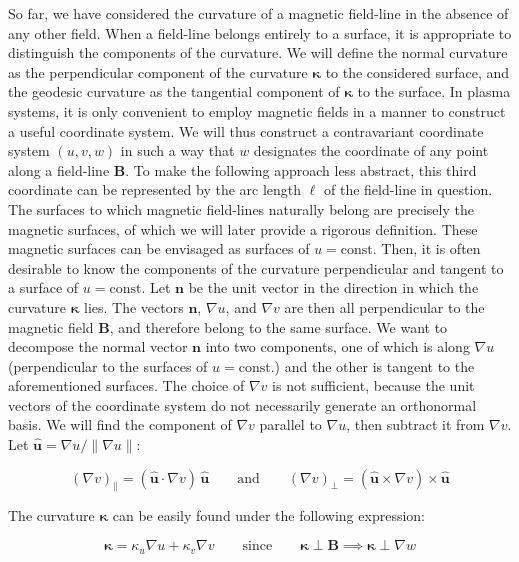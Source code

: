 So far, we have considered the curvature of a magnetic field-line in the absence of any other field. When a field-line belongs entirely to a surface, it is appropriate to distinguish the components of the curvature. We will define the normal curvature as the perpendicular component of the curvature $\boldsymbol{\kappa}$ to the considered surface, and the geodesic curvature as the tangential component of $\boldsymbol{\kappa}$ to the surface. In plasma systems, it is only convenient to employ magnetic fields in a manner to construct a useful coordinate system. We will thus construct a contravariant coordinate system $(u, v, w)$ in such a way that $w$ designates the coordinate of any point along a field-line $\mathbf{B}$. To make the following approach less abstract, this third coordinate can be represented by the arc length $\ell$ of the field-line in question. The surfaces to which magnetic field-lines naturally belong are precisely the magnetic surfaces, of which we will later provide a rigorous definition. These magnetic surfaces can be envisaged as surfaces of $u=\text{const.}$ Then, it is often desirable to know the components of the curvature perpendicular and tangent to a surface of $u=\text{const.}$ Let $\mathbf{n}$ be the unit vector in the direction in which the curvature $\boldsymbol{\kappa}$ lies. The vectors $\mathbf{n}$, $\nabla u$, and $\nabla v$ are then all perpendicular to the magnetic field $\mathbf{B}$, and therefore belong to the same surface. We want to decompose the normal vector $\mathbf{n}$ into two components, one of which is along $\nabla u$ (perpendicular to the surfaces of $u=\text{const.}$) and the other is tangent to the aforementioned surfaces. The choice of $\nabla v$ is not sufficient, because the unit vectors of the coordinate system do not necessarily generate an orthonormal basis. We will find the component of $\nabla v$ parallel to $\nabla u$, then subtract it from $\nabla v$. Let $\mathbf{\hat{u}}=\nabla u/\|\nabla u\|$:

\begin{equation}
    \label{eq-6-7}
    (\nabla v)_\parallel=(\mathbf{\hat{u}}\cdot\nabla v)\,\mathbf{\hat{u}}\quad\quad\text{and}\quad\quad(\nabla v)_\perp=(\mathbf{\hat{u}}\times\nabla v)\times\mathbf{\hat{u}}
\end{equation}

The curvature $\boldsymbol{\kappa}$ can be easily found under the following expression:

\begin{equation}
    \boldsymbol{\kappa}=\kappa_u\nabla u+\kappa_v\nabla v\quad\quad\text{since}\quad\quad\boldsymbol{\kappa}\perp\mathbf{B}\implies\boldsymbol{\kappa}\perp\nabla w
\end{equation}

